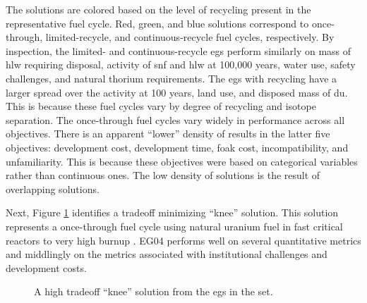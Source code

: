 The solutions are colored based on the level of recycling present in the
representative fuel cycle. Red, green, and blue solutions correspond to
once-through, limited-recycle, and continuous-recycle fuel cycles, respectively.
By inspection, the limited- and continuous-recycle \acp{eg} perform similarly on
mass of \ac{hlw} requiring disposal, activity of \ac{snf} and \ac{hlw} at
100,000 years, water use, safety challenges, and natural thorium requirements.
The \acp{eg} with recycling have a larger spread over the activity at 100 years,
land use, and disposed mass of \ac{du}. This is because these fuel cycles vary
by degree of recycling and isotope separation. The once-through fuel cycles vary
widely in performance across all objectives. There is an apparent ``lower''
density of results in the latter five objectives: development cost, development
time, \ac{foak} cost, incompatibility, and unfamiliarity. This is because these
objectives were based on categorical variables rather than continuous ones. The
low density of solutions is the result of overlapping solutions.



Next, Figure \ref{fig:single-eg-set-space} identifies a tradeoff minimizing
``knee'' solution. This solution represents a once-through fuel cycle using
natural uranium fuel in fast critical reactors to very high burnup
\cite{wigeland_nuclear_2014-2}. EG04 performs well on several quantitative
metrics and middlingly on the metrics associated with institutional challenges
and development costs.

\begin{figure}[htbp!]
  \centering
  \resizebox{0.85\columnwidth}{!}{}
  \caption{A high tradeoff ``knee'' solution from the \acp{eg} in the \ac{set}.}
  \label{fig:single-eg-set-space}
\end{figure}

\FloatBarrier


